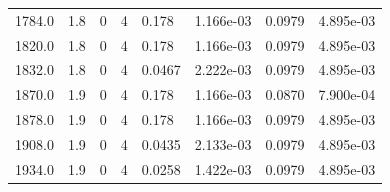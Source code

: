 \documentclass[preview]{standalone}
\begin{document}
{{{\begin{tabular}{L{1.2cm}C{1.2cm} C{0.3cm}C{0.5cm} C{1.4cm}C{1.4cm} C{1.4cm}C{1.4cm}}
  1784.0  &   1.8  & 0     &  4 &  0.178  & 1.166e-03  & 0.0979 &  4.895e-03   \\ 
  1820.0  &   1.8  & 0     &  4 &  0.178  & 1.166e-03  & 0.0979 &  4.895e-03   \\ 
  1832.0  &   1.8  & 0     &  4 &  0.0467  & 2.222e-03  & 0.0979 &  4.895e-03   \\ 
  1870.0  &   1.9  & 0     &  4 &  0.178  & 1.166e-03  & 0.0870 &  7.900e-04   \\ 
  1878.0  &   1.9  & 0     &  4 &  0.178  & 1.166e-03  & 0.0979 &  4.895e-03   \\ 
  1908.0  &   1.9  & 0     &  4 &  0.0435  & 2.133e-03  & 0.0979 &  4.895e-03   \\ 
  1934.0  &   1.9  & 0     &  4 &  0.0258  & 1.422e-03  & 0.0979 &  4.895e-03   \\ 
\hline 
\end{tabular} 

}}}
\end{document}
